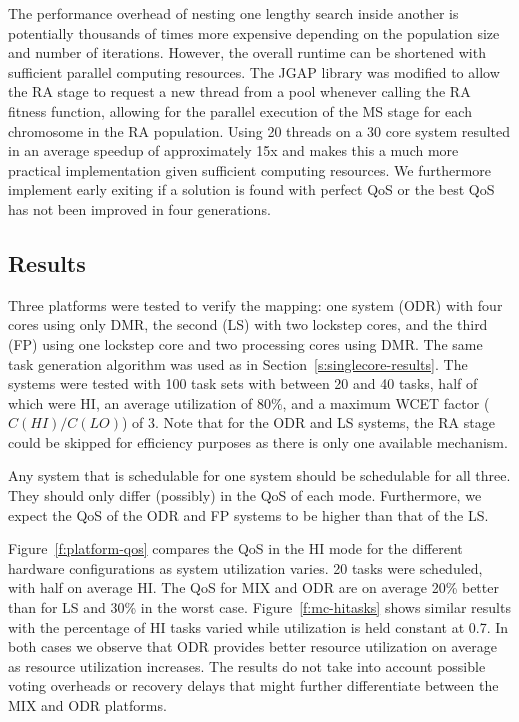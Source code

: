 	The performance overhead of nesting one lengthy search inside another is potentially thousands of times more expensive depending on the population size and number of iterations.
	However, the overall runtime can be shortened with sufficient parallel computing resources. 
	The JGAP library was modified to allow the RA stage to request a new thread from a pool whenever calling the RA fitness function, allowing for the parallel execution of the MS stage for each chromosome in the RA population.
	Using 20 threads on a 30 core system resulted in an average speedup of approximately 15x and makes this a much more practical implementation given sufficient computing resources. 
	We furthermore implement early exiting if a solution is found with perfect QoS or the best QoS has not been improved in four generations.

\subsection{Results}


	Three platforms were tested to verify the mapping: one system (ODR) with four cores using only DMR, the second (LS) with two lockstep cores, and the third (FP) using one lockstep core and two processing cores using DMR. 
	The same task generation algorithm was used as in Section~\ref{s:singlecore-results}. 
	The systems were tested with 100 task sets with between 20 and 40 tasks, half of which were HI, an average utilization of 80\%, and a maximum WCET factor ($C(HI)/C(LO)$) of 3. 
	Note that for the ODR and LS systems, the RA stage could be skipped for efficiency purposes as there is only one available mechanism.

	Any system that is schedulable for one system should be schedulable for all three. 
	They should only differ (possibly) in the QoS of each mode. 
	Furthermore, we expect the QoS of the ODR and FP systems to be higher than that of the LS.  

	
	Figure~\ref{f:platform-qos} compares the QoS in the HI mode for the different hardware configurations as system utilization varies. 20 tasks were scheduled, with half on average HI. The QoS for MIX and ODR are on average 20\% better than for LS and 30\% in the worst case. Figure~\ref{f:mc-hitasks} shows similar results with the percentage of HI tasks varied while utilization is held constant at 0.7. In both cases we observe that ODR provides better resource utilization on average as resource utilization increases. The results do not take into account possible voting overheads or recovery delays that might further differentiate between the MIX and ODR platforms. 


